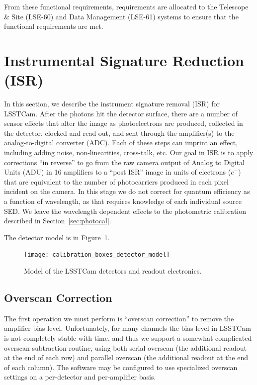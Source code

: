 \documentclass[SE,authoryear,lsstdraft,toc]{lsstdoc}
\newcommand{\etron}{e^{-}}
\begin{document}
From these functional requirements, requirements are allocated to the Telescope
\& Site (LSE-60) and Data Management (LSE-61) systems to ensure that the
functional requirements are met.

\section{Instrumental Signature Reduction (ISR)}

In this section, we describe the instrument signature removal (ISR) for
LSSTCam.  After the photons hit the detector surface, there are a number of
sensor effects that alter the image as photoelectrons are produced, collected
in the detector, clocked and read out, and sent through the amplifier(s) to the
analog-to-digital converter (ADC).  Each of these steps can imprint an effect,
including adding noise, non-linearities, cross-talk, etc.  Our goal in ISR is
to apply corrections ``in reverse'' to go from the raw camera output of Analog
to Digital Units (ADU) in 16 amplifiers to a ``post ISR'' image in units of
electrons ($\etron$) that are equivalent to the number of photocarriers
produced in each pixel incident on the camera.  In this stage we do not correct
for quantum efficiency as a function of wavelength, as that requires knowledge
of each individual source SED.  We leave the wavelength dependent effects to
the photometric calibration described in Section~\ref{sec:photocal}.

The detector model is in Figure~\ref{fig:detector_model}.


\begin{figure}[htb]
\centering
\texttt{[image: calibration\_boxes\_detector\_model]}
\caption{Model of the LSSTCam detectors and readout electronics.}
\label{fig:detector_model}
\vspace{0.1cm}
\end{figure}



\subsection{Overscan Correction}

The first operation we must perform is ``overscan correction'' to remove the
amplifier bias level.  Unfortunately, for many channels the bias level in
LSSTCam is not completely stable with time, and thus we support a somewhat
complicated overscan subtraction routine, using both serial overscan (the
additional readout at the end of each row) and parallel overscan (the
additional readout at the end of each column).  The software may be configured
to use specialized overscan settings on a per-detector and per-amplifier basis.
\end{document}
